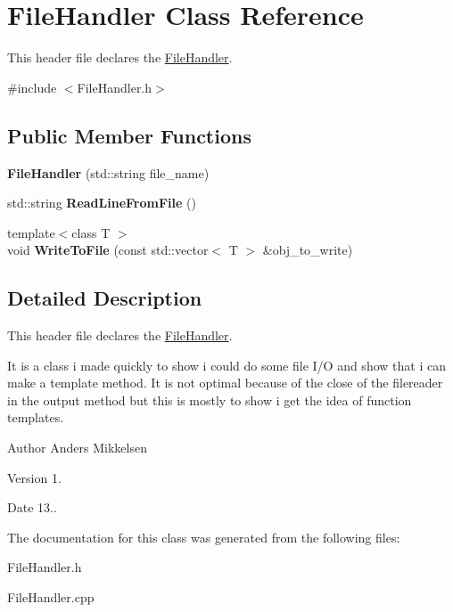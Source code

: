 \hypertarget{class_file_handler}{}\section{File\+Handler Class Reference}
\label{class_file_handler}


This header file declares the \hyperlink{class_file_handler}{File\+Handler}.  




{\ttfamily \#include $<$File\+Handler.\+h$>$}

\subsection*{Public Member Functions}
\begin{DoxyCompactItemize}
\item 
\hypertarget{class_file_handler_a1bb0b948b3e7edcf3ed9664966f96874}{}{\bfseries File\+Handler} (std\+::string file\+\_\+name)\label{class_file_handler_a1bb0b948b3e7edcf3ed9664966f96874}

\item 
\hypertarget{class_file_handler_aefa0e4203433ff72e5b7319fcc30f3da}{}std\+::string {\bfseries Read\+Line\+From\+File} ()\label{class_file_handler_aefa0e4203433ff72e5b7319fcc30f3da}

\item 
\hypertarget{class_file_handler_adb7f4ebdb0866bba60d6af7cdf37b521}{}{\footnotesize template$<$class T $>$ }\\void {\bfseries Write\+To\+File} (const std\+::vector$<$ T $>$ \&obj\+\_\+to\+\_\+write)\label{class_file_handler_adb7f4ebdb0866bba60d6af7cdf37b521}

\end{DoxyCompactItemize}


\subsection{Detailed Description}
This header file declares the \hyperlink{class_file_handler}{File\+Handler}. 

It is a class i made quickly to show i could do some file I/\+O and show that i can make a template method. It is not optimal because of the close of the filereader in the output method but this is mostly to show i get the idea of function templates.

\begin{DoxyAuthor}{Author}
Anders Mikkelsen 
\end{DoxyAuthor}
\begin{DoxyVersion}{Version}
1. 
\end{DoxyVersion}
\begin{DoxyDate}{Date}
13.. 
\end{DoxyDate}


The documentation for this class was generated from the following files\+:\begin{DoxyCompactItemize}
\item 
File\+Handler.\+h\item 
File\+Handler.\+cpp\end{DoxyCompactItemize}
